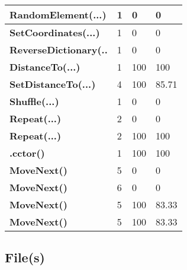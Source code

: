 \documentclass[a4paper,10pt]{article}
\begin{document}
\begin{longtable}[l]{|l|l|l|l|}
\hline
\textbf{RandomElement(...)} & 1 & 0 & 0\\
\hline
\textbf{SetCoordinates(...)} & 1 & 0 & 0\\
\hline
\textbf{ReverseDictionary(..} & 1 & 0 & 0\\
\hline
\textbf{DistanceTo(...)} & 1 & 100 & 100\\
\hline
\textbf{SetDistanceTo(...)} & 4 & 100 & 85.71\\
\hline
\textbf{Shuffle(...)} & 1 & 0 & 0\\
\hline
\textbf{Repeat(...)} & 2 & 0 & 0\\
\hline
\textbf{Repeat(...)} & 2 & 100 & 100\\
\hline
\textbf{.cctor()} & 1 & 100 & 100\\
\hline
\textbf{MoveNext()} & 5 & 0 & 0\\
\hline
\textbf{MoveNext()} & 6 & 0 & 0\\
\hline
\textbf{MoveNext()} & 5 & 100 & 83.33\\
\hline
\textbf{MoveNext()} & 5 & 100 & 83.33\\
\hline
\end{longtable}
\subsection{File(s)}
\end{document}
